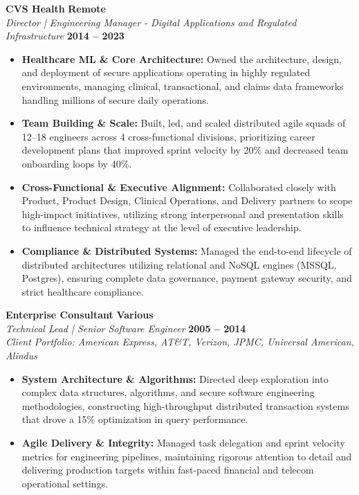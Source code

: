 \documentclass[9pt, letterpaper]{extarticle}
\begin{document}
\vfill

\textbf{CVS Health} \hfill \textbf{Remote} \\
\textit{Director | Engineering Manager - Digital Applications and Regulated Infrastructure} \hfill \textbf{2014 -- 2023}
\begin{itemize}
    \item \textbf{Healthcare ML \& Core Architecture:} Owned the architecture, design, and deployment of secure applications operating in highly regulated environments, managing clinical, transactional, and claims data frameworks handling millions of secure daily operations.
    \item \textbf{Team Building \& Scale:} Built, led, and scaled distributed agile squads of 12--18 engineers across 4 cross-functional divisions, prioritizing career development plans that improved sprint velocity by 20\% and decreased team onboarding loops by 40\%.
    \item \textbf{Cross-Functional \& Executive Alignment:} Collaborated closely with Product, Product Design, Clinical Operations, and Delivery partners to scope high-impact initiatives, utilizing strong interpersonal and presentation skills to influence technical strategy at the level of executive leadership.
    \item \textbf{Compliance \& Distributed Systems:} Managed the end-to-end lifecycle of distributed architectures utilizing relational and NoSQL engines (MSSQL, Postgres), ensuring complete data governance, payment gateway security, and strict healthcare compliance.
\end{itemize}

\vfill

\textbf{Enterprise Consultant} \hfill \textbf{Various} \\
\textit{Technical Lead | Senior Software Engineer} \hfill \textbf{2005 -- 2014} \\
\small\textit{Client Portfolio: American Express, AT\&T, Verizon, JPMC, Universal American, Alindus}
\begin{itemize}
    \item \textbf{System Architecture \& Algorithms:} Directed deep exploration into complex data structures, algorithms, and secure software engineering methodologies, constructing high-throughput distributed transaction systems that drove a 15\% optimization in query performance.
    \item \textbf{Agile Delivery \& Integrity:} Managed task delegation and sprint velocity metrics for engineering pipelines, maintaining rigorous attention to detail and delivering production targets within fast-paced financial and telecom operational settings.
\end{itemize}
\end{document}
